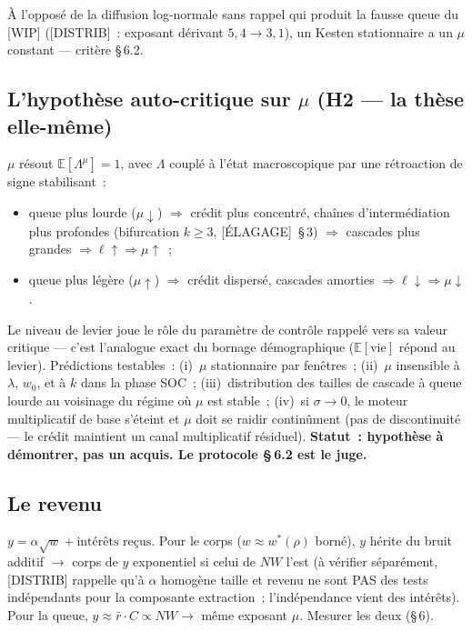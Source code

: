 \documentclass[11pt,a4paper]{article}
\newcommand{\NW}{\mathit{NW}}
\begin{document}
À l'opposé de la diffusion log-normale sans rappel qui produit la fausse queue du [WIP] ([DISTRIB]~: exposant dérivant $5{,}4 \to 3{,}1$), un Kesten stationnaire a un $\mu$ constant --- critère \S\,6.2.

\subsection{L'hypothèse auto-critique sur \texorpdfstring{$\mu$}{mu} (H2 --- la thèse elle-même)}
\label{sec:soc-hyp}

$\mu$ résout $\mathbb E[\Lambda^\mu]=1$, avec $\Lambda$ couplé à l'état macroscopique par une rétroaction de signe stabilisant~:

\begin{itemize}
  \item queue plus lourde ($\mu\downarrow$) $\Rightarrow$ crédit plus concentré, chaînes d'intermédiation plus profondes (bifurcation $k\geq 3$, [ÉLAGAGE]~\S\,3) $\Rightarrow$ cascades plus grandes $\Rightarrow \ell\uparrow \Rightarrow \mu\uparrow$~;
  \item queue plus légère ($\mu\uparrow$) $\Rightarrow$ crédit dispersé, cascades amorties $\Rightarrow \ell\downarrow \Rightarrow \mu\downarrow$.
\end{itemize}

Le niveau de levier joue le rôle du paramètre de contrôle rappelé vers sa valeur critique --- c'est l'analogue exact du bornage démographique ($\mathbb E[\text{vie}]$ répond au levier). Prédictions testables~: (i)~$\mu$ stationnaire par fenêtres~; (ii)~$\mu$ insensible à $\lambda$, $w_0$, et à $k$ dans la phase SOC~; (iii)~distribution des tailles de cascade à queue lourde au voisinage du régime où $\mu$ est stable~; (iv)~si $\sigma\to 0$, le moteur multiplicatif de base s'éteint et $\mu$ doit se raidir continûment (pas de discontinuité --- le crédit maintient un canal multiplicatif résiduel).
\textbf{Statut~: hypothèse à démontrer, pas un acquis. Le protocole \S\,6.2 est le juge.}

\subsection{Le revenu}
\label{sec:revenu}

$y = \alpha\sqrt{w} + \text{intérêts reçus}$. Pour le corps ($w\approx w^*(\rho)$ borné), $y$ hérite du bruit additif $\to$ corps de $y$ exponentiel si celui de $\NW$ l'est (à vérifier séparément, [DISTRIB] rappelle qu'à $\alpha$ homogène taille et revenu ne sont PAS des tests indépendants pour la composante extraction~; l'indépendance vient des intérêts). Pour la queue, $y\approx \bar r\cdot C \propto \NW \to$ même exposant $\mu$. Mesurer les deux (\S\,6).
\end{document}
